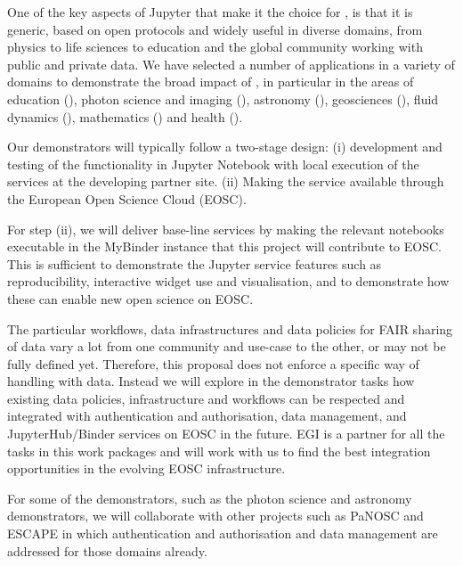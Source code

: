 \begin{workpackage}
\begin{wpdescription}
  One of the key aspects of Jupyter that make it the choice for
  \TheProject, is that it is generic, based on open protocols and
  widely useful in diverse domains, from physics to life sciences to
  education and the global community working with public and private
  data. We have selected a number of applications in a variety of domains
  to demonstrate the broad impact of \TheProject, in particular in the
  areas of education (), photon science and
  imaging (), astronomy
  (), geosciences (), 
  fluid dynamics (), 
  mathematics () and health ().

  \medskip
  Our demonstrators will typically follow a two-stage design: (i)
  development and testing of the functionality in Jupyter Notebook
  with local execution of the services at the developing partner
  site. (ii) Making the service available through the European Open
  Science Cloud (EOSC).

  For step (ii), we will deliver base-line services by making the
  relevant notebooks executable in the MyBinder instance that this
  project will contribute to EOSC. This is sufficient to demonstrate
  the Jupyter service features such as reproducibility, interactive
  widget use and visualisation, and to demonstrate how these can
  enable new open science on EOSC.

  The particular workflows, data infrastructures and data policies for
  FAIR sharing of data vary a lot from one community and use-case to
  the other, or may not be fully defined yet. Therefore, this proposal
  does not enforce a specific way of handling with data. Instead we
  will explore in the demonstrator tasks how existing data policies,
  infrastructure and workflows can be respected and integrated with
  authentication and authorisation, data management, and
  JupyterHub/Binder services on EOSC in the future. EGI is a partner
  for all the tasks in this work packages and will work with us to
  find the best integration opportunities in the evolving EOSC
  infrastructure.

  For some of the demonstrators, such as the photon science and
  astronomy demonstrators, we will collaborate with other projects
  such as PaNOSC and ESCAPE in which authentication and authorisation
  and data management are addressed for those domains already.
\end{wpdescription}


\end{workpackage}

